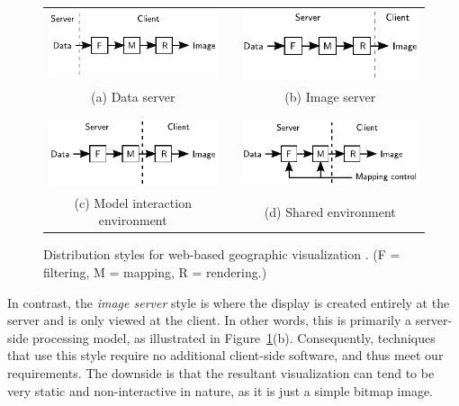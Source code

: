 \documentclass[acmtocl,acmnow]{acmtrans2m}
\begin{document}
\begin{figure}
	\centering
	\begin{tabular}{ccc}
		\includegraphics[scale=1]{data_server}	&
		\qquad	&
		\includegraphics[scale=1]{image_server}	\\
		\footnotesize (a) Data server	&
		\qquad	&
		\footnotesize (b) Image server	\\
		\\
		\\
		\includegraphics[scale=1]{model_interaction}	&
		\qquad	&
		\includegraphics[scale=1]{shared}	\\
		\footnotesize (c) Model interaction environment	&
		\qquad	&
		\footnotesize (d) Shared environment	\\
	\end{tabular}
	\caption{Distribution styles for web-based geographic visualization
	\protect\cite{Wood-J-1996-vis}. (F = filtering, M = mapping, R =
	rendering.)}
	\label{fig-distribution-styles}
\end{figure}


In contrast, the \emph{image server} style is where the display is
created entirely at the server and is only viewed at the client. In
other words, this is primarily a server-side processing model, as
illustrated in Figure~\ref{fig-distribution-styles}(b). Consequently,
techniques that use this style require no additional client-side
software, and thus meet our requirements. The downside is that the
resultant visualization can tend to be very static and non-interactive
in nature, as it is just a simple bitmap image.
\end{document}
